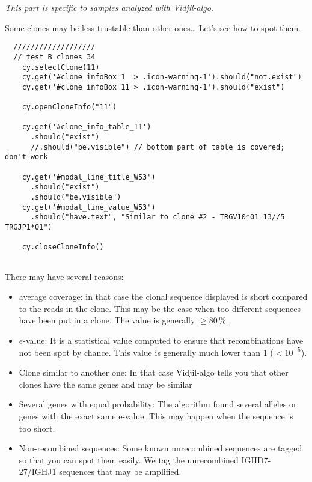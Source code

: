 \bigskip

\textit{This part is specific to samples analyzed with Vidjil-algo.}

Some clones may be less trustable than other ones\dots{} Let's see how to spot them.
\begin{verbatim}
  ///////////////////
  // test_B_clones_34
    cy.selectClone(11)
    cy.get('#clone_infoBox_1  > .icon-warning-1').should("not.exist")
    cy.get('#clone_infoBox_11 > .icon-warning-1').should("exist")

    cy.openCloneInfo("11")

    cy.get('#clone_info_table_11')
      .should("exist")
      //.should("be.visible") // bottom part of table is covered; don't work

    cy.get('#modal_line_title_W53')
      .should("exist")
      .should("be.visible")
    cy.get('#modal_line_value_W53')
      .should("have.text", "Similar to clone #2 - TRGV10*01 13//5 TRGJP1*01")

    cy.closeCloneInfo()


\end{verbatim}

There may have several reasons: 
\begin{itemize}
\item average coverage: in that case the clonal sequence displayed is short
  compared to the reads in the clone. This may be the case when too different
  sequences have been put in a clone. The value is generally $\geq 80\,\%$.
\item $e$-value: It is a statistical value computed to ensure that
  recombinations have not been spot by chance. This value is generally much
  lower than 1 ($<10^{-5}$).
\item Clone similar to another one: In that case Vidjil-algo tells you that
  other clones have the same genes and may be similar
\item Several genes with equal probability: The algorithm found several alleles or genes with the exact same e-value. This may happen when the sequence is too short.
\item Non-recombined sequences: Some known unrecombined sequences are tagged
  so that you can spot them easily. We tag the unrecombined IGHD7-27/IGHJ1
  sequences that may be amplified.
\end{itemize}

